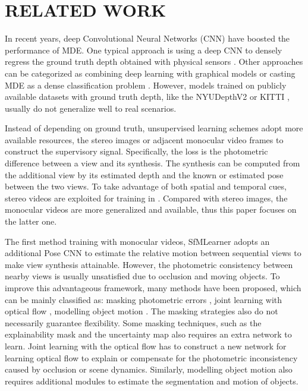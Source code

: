 \documentclass[letterpaper, 10 pt, conference]{ieeeconf}
\begin{document}
\section{RELATED WORK}
In recent years, deep Convolutional Neural Networks (CNN) have boosted the performance of MDE. One typical approach is using a deep CNN to densely regress the ground truth depth obtained with physical sensors \cite{eigen2014depth, laina2016deeper, zeng2017geocuedepth, jiang2019high}. 
Other approaches can be categorized as combining deep learning with graphical models \cite{wang2015towards, liu2015learning, xu2017multi} or casting MDE as a dense classification problem \cite{cao2017estimating, li2018monocular, fu2018deep}. 
However, models trained on publicly available datasets with ground truth depth, like the NYUDepthV2 \cite{silberman2012indoor} or KITTI \cite{geiger2013vision}, usually do not generalize well to real scenarios.

Instead of depending on ground truth, unsupervised learning schemes adopt more available resources, the stereo images \cite{garg2016unsupervised, godard2017unsupervised} or adjacent monocular video frames \cite{zhou2017unsupervised} to construct the supervisory signal. Specifically, the loss is the photometric difference between a view and its synthesis. The synthesis can be computed from the additional view by its estimated depth and the known or estimated pose between the two views. To take advantage of both spatial and temporal cues, stereo videos are exploited for training in \cite{zhan2018unsupervised, li2018undeepvo, luo2019every, godard2019digging}. Compared with stereo images, the monocular videos are more generalized and available, thus this paper focuses on the latter one.  

The first method training with monocular videos, SfMLearner \cite{zhou2017unsupervised} adopts an additional Pose CNN to estimate the relative motion between sequential views to make view synthesis attainable. However, the photometric consistency between nearby views is usually unsatisfied due to occlusion and moving objects. 
To improve this advantageous framework, many methods have been proposed, which can be mainly classified as: masking photometric errors \cite{zhou2017unsupervised, godard2019digging, klodt2018supervising, wang2019unsupervised}, joint learning with optical flow \cite{luo2019every, yin2018geonet, zou2018df}, modelling object motion \cite{casser2019struct2depth, vijayanarasimhan2017sfm, Gordon_2019_ICCV}. 
The masking strategies also do not necessarily guarantee flexibility. 
Some masking techniques, such as the explainability mask \cite{zhou2017unsupervised} and the uncertainty map \cite{klodt2018supervising} also requires an extra network to learn. 
Joint learning with the optical flow has to construct a new network for learning optical flow to explain or compensate for the photometric inconsistency caused by occlusion or scene dynamics. 
Similarly, modelling object motion also requires additional modules to estimate the segmentation and motion of objects. 
\end{document}
